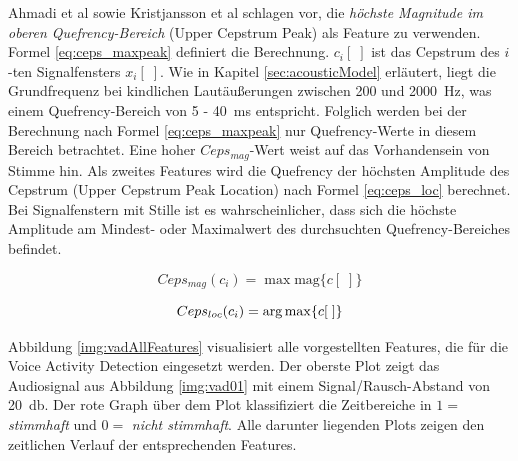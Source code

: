 Ahmadi et al \cite{vad_ceps} sowie Kristjansson et al\cite{vad_Lisboa} schlagen vor, die \emph{höchste Magnitude im oberen Quefrency-Bereich} (Upper Cepstrum Peak) als Feature zu verwenden. Formel \ref{eq:ceps_maxpeak} definiert die Berechnung. $c_i[\;]$ ist das Cepstrum des $i$-ten Signalfensters $x_i[\;]$. Wie in Kapitel \ref{sec:acousticModel} erläutert, liegt die Grundfrequenz bei kindlichen Lautäußerungen zwischen 200 und \SI{2000}{\hertz}, was einem Quefrency-Bereich von 5 - \SI{40}{\milli\second} entspricht. Folglich werden bei der Berechnung nach Formel \ref{eq:ceps_maxpeak} nur Quefrency-Werte in diesem Bereich betrachtet. Eine hoher $Ceps_{mag}$-Wert weist auf das Vorhandensein von Stimme hin. Als zweites Features wird die Quefrency der höchsten Amplitude des Cepstrum (Upper Cepstrum Peak Location) nach Formel \ref{eq:ceps_loc} berechnet. Bei Signalfenstern mit Stille ist es wahrscheinlicher, dass sich die höchste Amplitude am Mindest- oder Maximalwert des durchsuchten Quefrency-Bereiches befindet.

\begin{equation}
Ceps_{mag}(c_i) = \max\text{mag}\{c[\;]\}
\label{eq:ceps_maxpeak}
\end{equation}

\begin{equation}
Ceps_{loc}(c_i) = \operatorname*{arg\,max} \{c[\;]\}
\label{eq:ceps_loc}
\end{equation}

Abbildung \ref{img:vadAllFeatures} visualisiert alle vorgestellten Features, die für die Voice Activity Detection eingesetzt werden. Der oberste Plot zeigt das Audiosignal aus Abbildung \ref{img:vad01} mit einem Signal/Rausch-Abstand von \SI{20}{\decibel}. Der rote Graph über dem Plot klassifiziert die Zeitbereiche in $1 = $ \emph{stimmhaft} und $0 = $ \emph{nicht stimmhaft}. Alle darunter liegenden Plots zeigen den zeitlichen Verlauf der entsprechenden Features.

